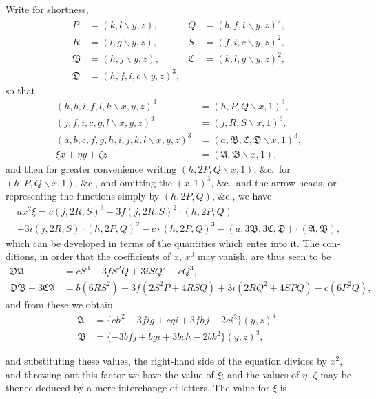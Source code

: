 \documentclass[11pt,a4paper]{article}
\begin{document}
Write for shortness,
\begin{align*}
P &= (k,l\!\backslash y,z), & Q &= (b,f,i\!\backslash y,z)^2,\\
R &= (l,g\!\backslash y,z), & S &= (f,i,c\!\backslash y,z)^2,\\
\mathfrak{B} &= (h,j\!\backslash y,z), & \mathfrak{C} &= (k,l,g\!\backslash y,z)^2,\\
\mathfrak{D} &= (h,f,i,c\!\backslash y,z)^3, &&
\end{align*}
so that
\begin{align*}
(h,b,i,f,l,k\!\backslash x,y,z)^3 &= (h,P,Q\!\backslash x,1)^3,\\
(j,f,i,c,g,l\!\backslash x,y,z)^3 &= (j,R,S\!\backslash x,1)^3,\\
(a,b,c,f,g,h,i,j,k,l\!\backslash x,y,z)^3 &= (a,\mathfrak{B},\mathfrak{C},\mathfrak{D}\!\backslash x,1)^3,\\
\xi x+\eta y+\zeta z &= (\mathfrak{A},\mathfrak{B}\!\backslash x,1),
\end{align*}
and then for greater convenience writing $(h,2P,Q\!\backslash x,1)$, \&c.\ for $(h,P,Q\!\backslash x,1)$, \&c.,
and omitting the $(x,1)^3$, \&c.\ and the arrow-heads, or representing the functions simply
by $(h,2P,Q)$, \&c., we have
\begin{multline*}
a x^2 \xi = c(j,2R,S)^3 - 3f(j,2R,S)^2\cdot(h,2P,Q) \\
+ 3i(j,2R,S)\cdot(h,2P,Q)^2 - c\cdot(h,2P,Q)^3 - (a,3\mathfrak{B},3\mathfrak{C},\mathfrak{D})\cdot(\mathfrak{A},\mathfrak{B}),
\end{multline*}
which can be developed in terms of the quantities which enter into it. The con-
ditions, in order that the coefficients of $x$, $x^0$ may vanish, are thus seen to be
\begin{align*}
\mathfrak{D}\mathfrak{A} &= cS^3 - 3fS^2Q + 3iSQ^2 - cQ^3,\\
\mathfrak{D}\mathfrak{B} - 3\mathfrak{C}\mathfrak{A} &= b(6RS^2) - 3f(2S^2P+4RSQ) + 3i(2RQ^2+4SPQ) - c(6P^2Q),
\end{align*}
and from these we obtain
\begin{align*}
\mathfrak{A} &= \{ch^2-3fig+cgi+3fhj-2ci^2\}(y,z)^4,\\
\mathfrak{B} &= \{-3bfj+bgi+3bch-2bk^2\}(y,z)^3,
\end{align*}

\newpage
\noindent and substituting these values, the right-hand side of the equation divides by $x^2$, and
throwing out this factor we have the value of $\xi$; and the values of $\eta$, $\zeta$ may be
thence deduced by a mere interchange of letters. The value for $\xi$ is
\end{document}
